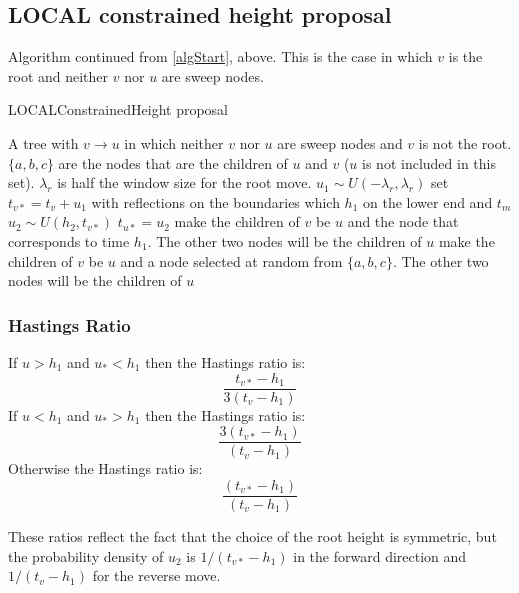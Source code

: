 \documentclass[letterpaper]{article}
\begin{document}
\subsection{LOCAL constrained height proposal}
Algorithm continued from \ref{algStart}, above. This is the case in which $v$ is the root and neither $v$ nor $u$ are sweep nodes.

\begin{algorithm} 
\caption{{\sf LOCALConstrainedHeight} proposal}
\label{lch}
\begin{algorithmic}[1]
	\REQUIRE A tree with $v\rightarrow u$ in which neither $v$ nor $u$ are sweep nodes and $v$ is not the root.  $\{a,b,c\}$ are the nodes that are the children of $u$ and $v$ ($u$ is not included in this set).
	\REQUIRE $\lambda_r$ is half the window size for the root move.
	\STATE $u_1 \sim U(-\lambda_r, \lambda_r)$
	\STATE set $t_{v*} = t_{v} + u_1$ with reflections on the boundaries which $h_1$ on the lower end and  $t_m$
	\STATE $u_2 \sim U(h_2, t_{v*})$
	\STATE $t_{u*} = u_2$
		\STATE make the children of $v$ be $u$ and the node that corresponds to time $h_1$. 
		\STATE The other two nodes will be the children of $u$
	\ELSE
		\STATE make the children of $v$ be $u$ and a node selected at random from $\{a,b,c\}$. 
		\STATE The other two nodes will be the children of $u$
	\ENDIF
\end{algorithmic}
\end{algorithm} 


\subsubsection{Hastings Ratio}
If $u > h_1$ and $u_{*} < h_1$ then the Hastings ratio is:
\[\frac{t_{v*}-h_1}{3(t_v-h_1)}\]
If $u < h_1$ and $u_{*} > h_1$ then the Hastings ratio is:
\[\frac{3(t_{v*}-h_1)}{(t_v-h_1)}\]
Otherwise the Hastings ratio is:
\[\frac{(t_{v*}-h_1)}{(t_v-h_1)}\]

These ratios reflect the fact that the choice of the root height is symmetric, but the probability density of $u_2$ is $1/(t_{v*}-h_1)$ in the forward direction and $1/(t_{v}-h_1)$ for the reverse move.
\end{document}

